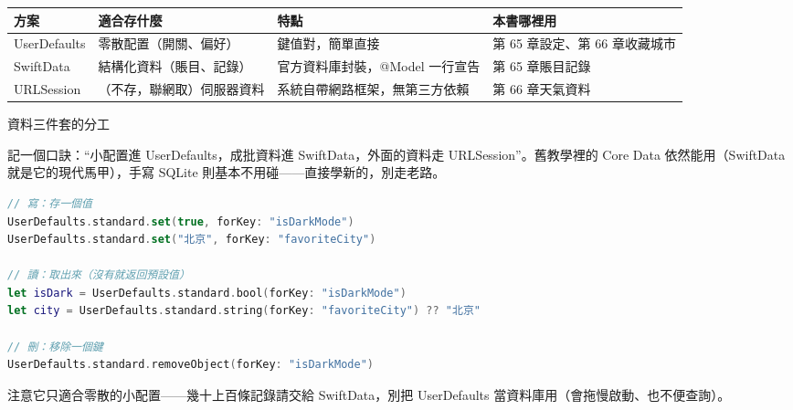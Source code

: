 


\begin{center}
\begin{tabularx}{\linewidth}{|X|X|X|X|}
\hline
\textbf{方案} & \textbf{適合存什麼} & \textbf{特點} & \textbf{本書哪裡用} \tabularnewline
\hline
UserDefaults & 零散配置（開關、偏好） & 鍵值對，簡單直接 & 第 65 章設定、第 66 章收藏城市 \tabularnewline
SwiftData & 結構化資料（賬目、記錄） & 官方資料庫封裝，@Model 一行宣告 & 第 65 章賬目記錄 \tabularnewline
URLSession & （不存，聯網取）伺服器資料 & 系統自帶網路框架，無第三方依賴 & 第 66 章天氣資料 \tabularnewline
\hline
\end{tabularx}
\end{center}

\begin{center}\small\color{gray}資料三件套的分工\end{center}

記一個口訣：“小配置進 UserDefaults，成批資料進 SwiftData，外面的資料走 URLSession”。舊教學裡的 Core Data 依然能用（SwiftData 就是它的現代馬甲），手寫 SQLite 則基本不用碰——直接學新的，別走老路。


\begin{lstlisting}[language=Swift]
// 寫：存一個值
UserDefaults.standard.set(true, forKey: "isDarkMode")
UserDefaults.standard.set("北京", forKey: "favoriteCity")

// 讀：取出來（沒有就返回預設值）
let isDark = UserDefaults.standard.bool(forKey: "isDarkMode")
let city = UserDefaults.standard.string(forKey: "favoriteCity") ?? "北京"

// 刪：移除一個鍵
UserDefaults.standard.removeObject(forKey: "isDarkMode")
\end{lstlisting}

注意它只適合零散的小配置——幾十上百條記錄請交給 SwiftData，別把 UserDefaults 當資料庫用（會拖慢啟動、也不便查詢）。


